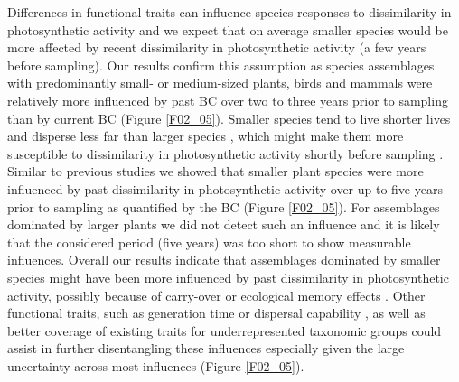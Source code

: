 Differences in functional traits can influence species responses to dissimilarity in photosynthetic activity \citep{Newbold2013,DePalma2015} and we expect that on average smaller species would be more affected by recent dissimilarity in photosynthetic activity (a few years before sampling). Our results confirm this assumption as species assemblages with predominantly small- or medium-sized plants, birds and mammals were relatively more influenced by past BC over two to three years prior to sampling than by current BC (Figure \ref{F02_05}). Smaller species tend to live shorter lives and disperse less far than larger species \citep{Brown2004,Thomson2011,Stevens2014}, which might make them more susceptible to dissimilarity in photosynthetic activity shortly before sampling \citep{Watson2014}. Similar to previous studies \citep{Jakovac2016} we showed that smaller plant species were more influenced by past dissimilarity in photosynthetic activity over up to five years prior to sampling as quantified by the BC (Figure \ref{F02_05}). For assemblages dominated by larger plants we did not detect such an influence and it is likely that the considered period (five years) was too short to show measurable influences. Overall our results indicate that assemblages dominated by smaller species might have been more influenced by past dissimilarity in photosynthetic activity,  possibly because of carry-over or ecological memory effects \citep{Harrison2011,Ogle2015}. Other functional traits, such as generation time or dispersal capability \citep{Watson2014}, as well as better coverage of existing traits for underrepresented taxonomic groups could assist in further disentangling these influences especially given the large uncertainty across most influences (Figure \ref{F02_05}). 

